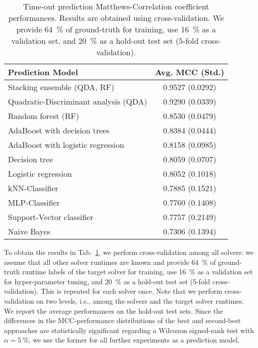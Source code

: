 \documentclass[runningheads]{llncs}
\begin{document}
\begin{table}
  \centering
  \caption{Time-out prediction Matthews-Correlation coefficient performances. Results are obtained using cross-validation. We provide \SI{64}{\%} of ground-truth for training, use \SI{16}{\%} as a validation set, and \SI{20}{\%} as a hold-out test set (5-fold cross-validation).}
  \label{tab:mcc}
  \begin{tabular}{lc}
    Prediction Model & Avg. MCC (Std.) \\
    \hline
    Stacking ensemble (QDA, RF)           & 0.9527 (0.0292) \\
    Quadratic-Discriminant analysis (QDA) & 0.9290 (0.0339) \\
    Random forest (RF)                    & 0.8530 (0.0479) \\
    AdaBoost with decision trees          & 0.8384 (0.0444) \\
    AdaBoost with logistic regression     & 0.8158 (0.0985) \\
    Decision tree                         & 0.8059 (0.0707) \\
    Logistic regression                   & 0.8052 (0.1018) \\
    kNN-Classifier                        & 0.7885 (0.1521) \\
    MLP-Classifier                        & 0.7760 (0.1408) \\
    Support-Vector classifier             & 0.7757 (0.2149) \\
    Naive Bayes                           & 0.7306 (0.1394) \\
    \hline
  \end{tabular}
\end{table}


To obtain the results in Tab.~\ref{tab:mcc}, we perform cross-validation among all solvers: we assume that all other solver runtimes are known and provide \SI{64}{\%} of ground-truth runtime labels of the target solver for training, use \SI{16}{\%} as a validation set for hyper-parameter tuning, and \SI{20}{\%} as a hold-out test set (5-fold cross-validation).
This is repeated for each solver once.
Note that we perform cross-validation on two levels, i.e., among the solvers and the target solver runtimes.
We report the average performances on the hold-out test sets.
Since the differences in the MCC-performance distributions of the best and second-best approaches are statistically significant regarding a Wilcoxon signed-rank test with $\alpha = \SI{5}{\%}$, we use the former for all further experiments as a prediction model.
\end{document}
